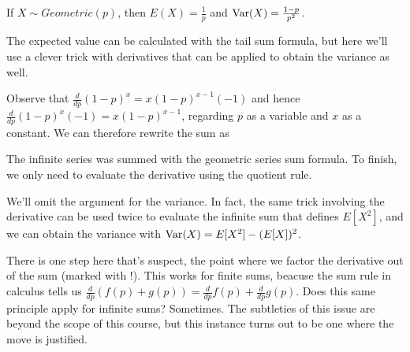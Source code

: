 \begin{thm}\label{GeometricExpectation}
If $X \sim Geometric(p)$, then $E(X) = \frac{1}{p}$ and $\operatorname{Var}(X) = \frac{1-p}{p^2}$.
\end{thm}
\begin{pf} The expected value can be calculated with the tail sum formula, but here we'll use a clever trick with derivatives that can be applied to obtain the variance as well.
\par
\noindent Observe that $\frac{d}{dp}(1-p)^x = x(1-p)^{x-1}(-1)$ and hence $\frac{d}{dp}(1-p)^x(-1) = x(1-p)^{x-1}$, regarding $p$ as a variable and $x$ as a constant. We can therefore rewrite the sum as
\par
\noindent The infinite series was summed with the geometric series sum formula. To finish, we only need to evaluate the derivative using the quotient rule.
\end{pf}

\par
We'll omit the argument for the variance. In fact, the same trick involving the derivative can be used twice to evaluate the infinite sum that defines $E[X^2]$, and we can obtain the variance with $\operatorname{Var}(X) = E[X^2] - (E[X])^2$.
\par
There is one step here that's suspect, the point where we factor the derivative out of the sum (marked with !). This works for finite sums, beacuse the sum rule in calculus tells us $\frac{d}{dp}(f(p) + g(p)) = \frac{d}{dp} f(p) + \frac{d}{dp} g(p)$. Does this same principle apply for infinite sums? Sometimes. The subtleties of this issue are beyond the scope of this course, but this instance turns out to be one where the move is justified.


